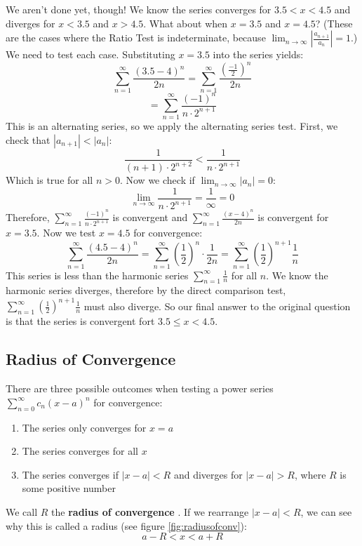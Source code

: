 We aren't done yet, though! We know the series converges for $3.5 < x < 4.5$ 
and diverges for $x < 3.5$ and $x > 4.5$. What about when $x = 3.5$ and $x = 
4.5$? (These are the cases where the Ratio Test is indeterminate, because 
$\lim_{n \to \infty} \left| \frac{a_{n+1}}{a_n} \right| = 1$.) We need to test 
each case. Substituting $x = 3.5$ into the series yields:
$$\sum_{n=1}^\infty \frac{(3.5-4)^n}{2n} = \sum_{n=1}^\infty \frac{\left( 
\frac{-1}{2} \right)^n}{2n}$$
$$= \sum_{n=1}^\infty \frac{(-1)^n}{n \cdot 2^{n+1}}$$
This is an alternating series, so we apply the alternating series test. First, 
we check that $|a_{n+1}| < |a_n|$:
$$\frac{1}{(n+1) \cdot 2^{n+2}}  < \frac{1}{n \cdot 2^{n+1}}$$
Which is true for all $n > 0$. Now we check if $\lim_{n \to \infty} |a_n| = 0$:
$$\lim_{n \to \infty} \frac{1}{n \cdot 2^{n+1}} = \frac{1}{\infty} = 0$$
Therefore, $\sum_{n=1}^\infty \frac{(-1)^n}{n \cdot 2^{n+1}}$ is convergent 
and $\sum_{n=1}^\infty \frac{(x-4)^n}{2n}$ is convergent for $x = 3.5$. Now we 
test $x=4.5$ for convergence:
$$\sum_{n=1}^\infty \frac{(4.5-4)^n}{2n} = \sum_{n=1}^\infty \left( 
\frac{1}{2} \right)^n \cdot \frac{1}{2n} = \sum_{n=1}^\infty \left( 
\frac{1}{2} \right)^{n+1} \frac{1}{n}$$
This series is less than the harmonic series $\sum_{n=1}^\infty \frac{1}{n}$ 
for all $n$. We know the harmonic series diverges, therefore by the direct 
comparison test, $\sum_{n=1}^\infty \left( \frac{1}{2} \right)^{n+1} 
\frac{1}{n}$ must also diverge. So our final answer to the original question 
is that the series is convergent fort $3.5 \leq x < 4.5$. 

\subsection{Radius of Convergence}
There are three possible outcomes when testing a power series $\sum_{n=0}^
\infty c_n (x-a)^n$ for convergence:
\begin{enumerate}
\item The series only converges for $x = a$
\item The series converges for all $x$
\item The series converges if $|x - a| < R$ and diverges for $|x - a| > R$, 
where $R$ is some positive number
\end{enumerate}

We call $R$ the \textbf{radius of convergence} . 
If we rearrange $|x - a| < R$, we can see why this is called a radius (see 
figure \ref{fig:radiusofconv}): 
$$a - R < x < a + R$$

